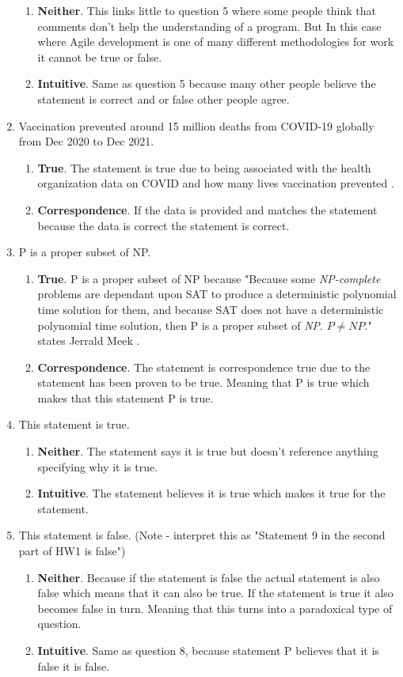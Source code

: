 \documentclass{article}
\begin{document}
\begin{enumerate}
 \begin{enumerate}
     \item \textbf{Neither}. This links little to question 5 where some people think that comments don't help the understanding of a program. But In this case where Agile development is one of many different methodologies for work it cannot be true or false.
     \item \textbf{Intuitive}. Same as question 5 because many other people believe the statement is correct and or false other people agree.
 \end{enumerate}
	\item Vaccination prevented around 15 million deaths from COVID-19 globally from Dec 2020 to Dec 2021.
 \begin{enumerate}
     \item \textbf{True}. The statement is true due to being associated with the health organization data on COVID and how many lives vaccination prevented \cite{watson_global_2022}.
     \item \textbf{Correspondence}. If the data is provided and matches the statement because the data is correct the statement is correct.
 \end{enumerate}
	\item P is a proper subset of NP.
 \begin{enumerate}
     \item \textbf{True}. P is a proper subset of NP because "Because some \textit{NP-complete} problems are dependant upon SAT to produce a deterministic polynomial time solution for them, and because SAT does not have a deterministic polynomial time solution, then P is a proper subset of \textit{NP}. \(P\neq NP\)." states Jerrald Meek \cite{fal_2008}.
     \item \textbf{Correspondence}. The statement is correspondence true due to the statement has been proven to be true. Meaning that P is true which makes that this statement P is true.
 \end{enumerate}
	\item This statement is true.
 \begin{enumerate}
     \item \textbf{Neither}. The statement says it is true but doesn't reference anything specifying why it is true.
     \item \textbf{Intuitive}. The statement believes it is true which makes it true for the statement.
 \end{enumerate}
	\item This statement is false. (Note - interpret this as "Statement 9 in the second part of HW1 is false")
 \begin{enumerate}
     \item \textbf{Neither}. Because if the statement is false the actual statement is also false which means that it can also be true. If the statement is true it also becomes false in turn. Meaning that this turns into a paradoxical type of question.
     \item \textbf{Intuitive}.  Same as question 8, because statement P believes that it is false it is false.
 \end{enumerate}
\end{enumerate}




\end{document}
